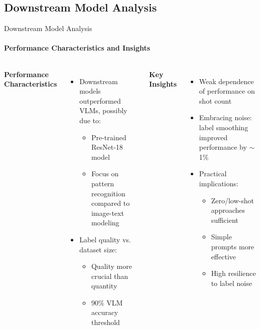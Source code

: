 \subsection{Downstream Model Analysis}
\begin{frame}{Downstream Model Analysis}
\framesubtitle{Performance Characteristics and Insights}
  \vspace{-1em}
  \begin{columns}[T]
    \column{\customcolumnwidth}
      \textbf{Performance Characteristics}
      \begin{itemize}
        \item Downstream models outperformed VLMs, possibly due to:
        \begin{itemize}
          \item Pre-trained ResNet-18 model~
          \item Focus on pattern recognition compared to image-text modeling
        \end{itemize}
        \item Label quality vs. dataset size:
        \begin{itemize}
          \item Quality more crucial than quantity
          \item 90\% VLM accuracy threshold
        \end{itemize}
      \end{itemize}
    \column{\customcolumnwidth}
      \textbf{Key Insights}
      \begin{itemize}
        \item Weak dependence of performance on shot count
        \item Embracing noise: label smoothing improved performance by \(\sim\)1\%
        \item Practical implications:
        \begin{itemize}
          \item Zero/low-shot approaches sufficient
          \item Simple prompts more effective
          \item High resilience to label noise
        \end{itemize}
      \end{itemize}
  \end{columns}
\end{frame}
